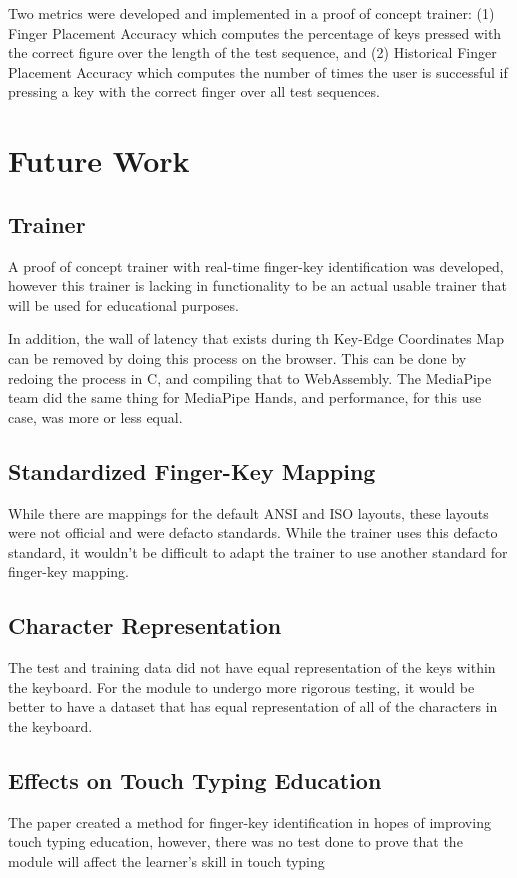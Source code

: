 \documentclass{report}
\begin{document}
Two metrics were developed and implemented in a proof of concept trainer: (1)
Finger Placement Accuracy which computes the percentage of keys pressed with the
correct figure over the length of the test sequence, and (2) Historical Finger
Placement Accuracy which computes the number of times the user is successful if
pressing a key with the correct finger over all test sequences.

\chapter{Future Work}


\section{Trainer}
A proof of concept trainer with real-time finger-key identification was
developed, however this trainer is lacking in functionality to be an actual
usable trainer that will be used for educational purposes.

In addition, the wall of latency that exists during th Key-Edge Coordinates Map
can be removed by doing this process on the browser. This can be done by redoing
the process in C, and compiling that to WebAssembly. The MediaPipe team did the
same thing for MediaPipe Hands, and performance, for this use case, was more or
less equal.

\section{Standardized Finger-Key Mapping}
While there are mappings for the default ANSI and ISO layouts, these layouts
were not official and were defacto standards. While the trainer uses this
defacto standard, it wouldn't be difficult to adapt the trainer to use another
standard for finger-key mapping.


\section{Character Representation}
The test and training data did not have equal representation of the keys within
the keyboard. For the module to undergo more rigorous testing, it would be
better to have a dataset that has equal representation of all of the characters
in the keyboard.

\section{Effects on Touch Typing Education}
The paper created a method for finger-key identification in hopes of improving
touch typing education, however, there was no test done to prove that the module
will affect the learner's skill in touch typing
\end{document}

